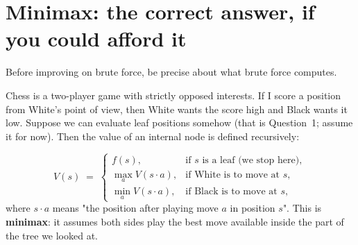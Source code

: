 \section{Minimax: the correct answer, if you could afford it}

Before improving on brute force, be precise about what brute force computes.

Chess is a two-player game with strictly opposed interests. If I score a position from
White's point of view, then White wants the score high and Black wants it low. Suppose we
can evaluate leaf positions somehow (that is Question~1; assume it for now). Then the value
of an internal node is defined recursively:

\begin{equation}
  \label{eq:minimax}
  V(s) \;=\;
  \begin{cases}
    f(s), & \text{if $s$ is a leaf (we stop here)},\\[4pt]
    \max_{a} V(s\!\cdot\!a), & \text{if White is to move at $s$},\\[4pt]
    \min_{a} V(s\!\cdot\!a), & \text{if Black is to move at $s$},
  \end{cases}
\end{equation}
where $s\!\cdot\!a$ means "the position after playing move $a$ in position $s$". This is
\textbf{minimax}: it assumes both sides play the best move available inside the part of the
tree we looked at.

